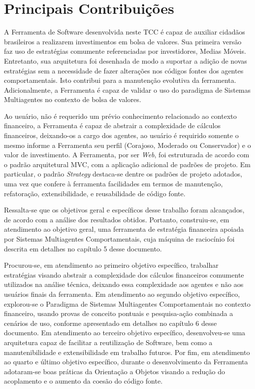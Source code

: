 \section{Principais Contribuições}

A Ferramenta de Software desenvolvida neste TCC é capaz de auxiliar cidadãos brasileiros a realizarem investimentos em bolsa de valores. Sua primeira versão faz uso de estratégias comumente referenciadas por investidores, Medias Móveis.  Entretanto, sua arquitetura foi desenhada de modo a suportar a adição de novas estratégias sem a necessidade de fazer alterações nos códigos fontes dos agentes comportamentais. Isto contribui para a manutenção evolutiva da ferramenta. Adicionalmente, a Ferramenta é capaz de validar o uso do paradigma de Sistemas Multiagentes no contexto de bolsa de valores.

Ao usuário, não é requerido um prévio conhecimento relacionado ao contexto financeiro, a Ferramenta é capaz de abstrair a complexidade de cálculos financeiros, deixando-os a cargo dos agentes, ao usuário é requirido somente o mesmo informe a Ferramenta seu perfil (Corajoso, Moderado ou Conservador) e o valor de investimento. A Ferramenta, por ser \textit{Web}, foi estruturada de acordo com o padrão arquitetural MVC, com a aplicação adicional de padrões de projeto. Em particular, o padrão \textit{Strategy} destaca-se dentre os padrões de projeto adotados, uma vez que confere à ferramenta facilidades em termos de manutenção, refatoração, extensibilidade, e reusabilidade de código fonte.

Ressalta-se que os objetivos geral e específicos desse trabalho foram alcançados, de acordo com a análise dos resultados obtidos. Portanto, construiu-se, em atendimento ao objetivo geral, uma ferramenta de estratégia financeira apoiada por Sistemas Multiagentes Comportamentais, cuja máquina de raciocínio foi descrita em detalhes no capítulo 5 desse documento.

Procurou-se, em atendimento ao primeiro objetivo específico, trabalhar estratégias visando abstrair a complexidade dos cálculos financeiros comumente utilizados na análise técnica, deixando essa complexidade aos agentes e não aos usuários finais da ferramenta. Em atendimento ao segundo objetivo específico, explorou-se o Paradigma de Sistemas Multiagentes Comportamentais no contexto financeiro, usando provas de conceito pontuais e pesquisa-ação combinada a cenários de uso, conforme apresentado em detalhes no capítulo 6 desse documento. Em atendimento ao terceiro objetivo específico, desenvolveu-se uma arquitetura capaz de facilitar a reutilização de Software, bem como a manutenibilidade e extensibilidade em trabalho futuros. Por fim, em atendimento ao quarto e último objetivo específico, durante o desenvolvimento da Ferramenta adotaram-se boas práticas da Orientação a Objetos visando a redução do acoplamento e o aumento da coesão do código fonte.


